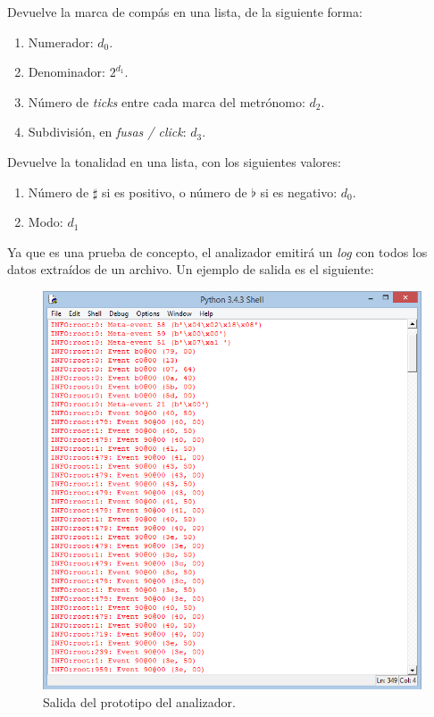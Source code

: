 \begin{description}[style=nextline]
	\item[\code{time(self)}]
	Devuelve la marca de compás en una lista, de la siguiente forma:
	
	\begin{enumerate}
		\item Numerador: $d_0$.
		\item Denominador: $2^{d_1}$.
		\item Número de \textit{ticks} entre cada marca del metrónomo: $d_2$.
		\item Subdivisión, en \textit{fusas / click}: $d_3$.
	\end{enumerate}
	
	\item[\code{key(self)}]
	Devuelve la tonalidad en una lista, con los siguientes valores:
	
	\begin{enumerate}
		\item Número de $\sharp$ si es positivo, o número de $\flat$ si es negativo: $d_0$.
		\item Modo: $d_1$
	\end{enumerate}
\end{description}

Ya que es una prueba de concepto, el analizador emitirá un \textit{log} con  todos los datos extraídos de un archivo. Un ejemplo de salida es el siguiente:

\smallskip

\begin{figure}[H]
	\noindent \begin{centering}
		\includegraphics[width=\linewidth/2]{capitulo5/cap_parser}
		\par\end{centering}
	\smallskip
	\caption{\label{fig:cap_parser} Salida del prototipo del analizador.}
\end{figure}

